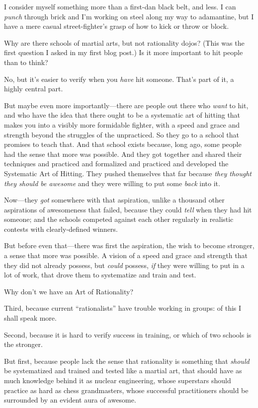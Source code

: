 {
 I consider myself something more than a first-dan black belt, and
less. I can \textit{punch} through brick and I'm
working on steel along my way to adamantine, but I have a mere casual
street-fighter's grasp of how to kick or throw or
block.}

{
 Why are there schools of martial arts, but not rationality dojos?
(This was the first question I asked in my first blog post.) Is it more
important to hit people than to think?}

{
 No, but it's easier to verify when you
\textit{have} hit someone. That's part of it, a highly
central part.}

{
 But maybe even more importantly---there are people out there who
\textit{want} to hit, and who have the idea that there ought to be a
systematic art of hitting that makes you into a visibly more formidable
fighter, with a speed and grace and strength beyond the struggles of
the unpracticed. So they go to a school that promises to teach that.
And that school exists because, long ago, some people had the sense
that more was possible. And they got together and shared their
techniques and practiced and formalized and practiced and developed the
Systematic Art of Hitting. They pushed themselves that far because
\textit{they thought they should be awesome} and they were willing to
put some \textit{back} into it.}

{
 Now---they \textit{got} somewhere with that aspiration, unlike a
thousand other aspirations of awesomeness that failed, because they
could \textit{tell} when they had hit someone; and the schools competed
against each other regularly in realistic contests with clearly-defined
winners.}

{
 But before even that---there was first the aspiration, the wish to
become stronger, a sense that more was possible. A vision of a speed
and grace and strength that they did not already possess, but
\textit{could} possess, \textit{if} they were willing to put in a lot
of work, that drove them to systematize and train and test.}

{
 Why don't we have an Art of Rationality?}

{
 Third, because current
``rationalists'' have trouble
working in groups: of this I shall speak more.}

{
 Second, because it is hard to verify success in training, or which
of two schools is the stronger.}

{
 But first, because people lack the sense that rationality is
something that \textit{should} be systematized and trained and tested
like a martial art, that should have as much knowledge behind it as
nuclear engineering, whose superstars should practice as hard as chess
grandmasters, whose successful practitioners should be surrounded by an
evident aura of awesome.}

